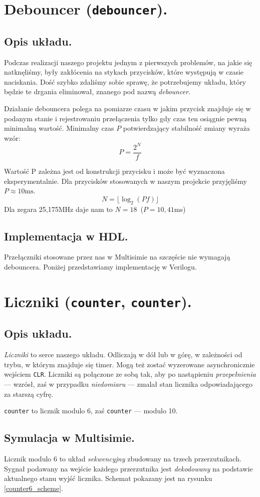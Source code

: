 \documentclass[a4paper,oneside]{report}
\newcommand{\debouncer}{\texttt{debouncer}}
\newcommand{\counter}[1]{\texttt{counter\textunderscore #1}}
\begin{document}
\section{Debouncer (\debouncer).}
\subsection{Opis układu.}
Podczas realizacji naszego projektu jednym z pierwszych problemów,
na jakie się natknęliśmy, były zakłócenia na stykach przycisków,
które występują w czasie naciskania. Dość szybko zdaliśmy sobie
sprawę, że potrzebujemy układu, który będzie te drgania eliminował,
znanego pod nazwą \emph{debouncer}.

Działanie debouncera polega na pomiarze czasu w jakim przycisk 
znajduje się w podanym stanie i rejestrowaniu przełączenia tylko 
gdy czas ten osiągnie pewną minimalną wartość. 
Minimalny czas $P$ potwierdzający stabilność zmiany wyraża wzór:
$$ 
P = \frac{2^N}{f} 
$$

Wartość P zależna jest od konstrukcji przycisku i może być wyznaczona
eksperymentalnie. Dla przycisków stosowanych w naszym projekcie przyjęliśmy
$P \approx 10\mathrm{ms}$.
$$
N = \lfloor\log_2(Pf)\rfloor
$$
Dla zegara 25,175MHz daje nam to $N=18$\ ($P=10,41$ms)
\subsection{Implementacja w HDL.}
Przełączniki stosowane przez nas w Multisimie na szczęście nie wymagają
debouncera. Poniżej przedstawiamy implementację w Verilogu.
\pagebreak


\section{Liczniki (\counter{6}, \counter{10}).}
\subsection{Opis układu.}
\emph{Liczniki} to serce naszego układu. Odliczają w dół lub w
górę, w zależności od trybu, w którym znajduje się timer. Mogą też
zostać wyzerowane asynchronicznie wejściem \texttt{CLR}. Liczniki
są połączone ze sobą tak, aby po nastąpieniu \emph{przepełnienia}
--- wzrósł, zaś w przypadku \emph{niedomiaru} --- zmalał stan
licznika odpowiadającego za starszą cyfrę.

\counter{6} to licznik modulo 6, zaś \counter{10} --- modulo 10.
\subsection{Symulacja w Multisimie.}
Licznik modulo 6 to układ \emph{sekwencyjny} zbudowany na trzech
przerzutnikach. Sygnał podawany na wejście każdego przerzutnika jest
\emph{dekodowany} na podstawie aktualnego stanu wyjść licznika. Schemat pokazany jest na rysunku \ref{counter6_scheme}.
\end{document}
